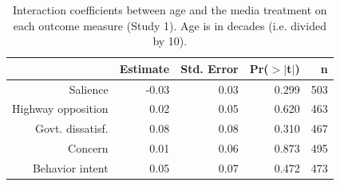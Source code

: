 \begin{table}[ht]
\centering
\caption{Interaction coefficients between age and the media
             treatment on each outcome measure (Study 1). Age is in decades
             (i.e. divided by 10).} 
\label{tab:disruption_byage}
\begin{tabular}{rrrrr}
  \hline
 & Estimate & Std. Error & Pr($>$$|$t$|$) & n \\ 
  \hline
Salience & -0.03 & 0.03 & 0.299 & 503 \\ 
  Highway opposition & 0.02 & 0.05 & 0.620 & 463 \\ 
  Govt. dissatisf. & 0.08 & 0.08 & 0.310 & 467 \\ 
  Concern & 0.01 & 0.06 & 0.873 & 495 \\ 
  Behavior intent & 0.05 & 0.07 & 0.472 & 473 \\ 
   \hline
\end{tabular}
\end{table}
